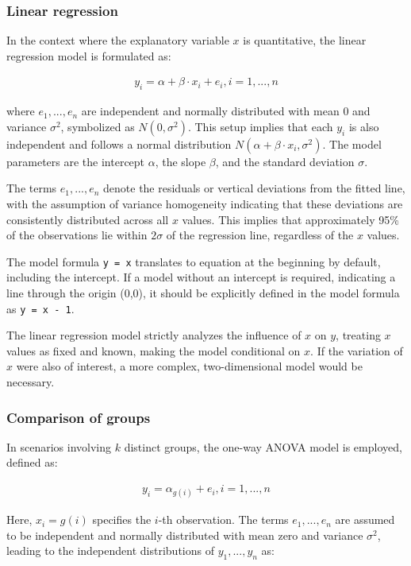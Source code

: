 \documentclass{article}
\begin{document}
\subsubsection{Linear regression}

In the context where the explanatory variable $x$ is quantitative, the linear regression model is formulated as:

\begin{align*}
    y_i=\alpha + \beta \cdot x_i + e_i, i=1,...,n
\end{align*}

where $e_1,...,e_n$ are independent and normally distributed with mean 0 and variance $\sigma^2$, symbolized as $N(0,\sigma^2)$. This setup implies that each $y_i$ is also independent and follows a normal distribution $N(\alpha + \beta \cdot x_i,\sigma^2)$. The model parameters are the intercept $\alpha$, the slope $\beta$, and the standard deviation $\sigma$.

The terms $e_1,...,e_n$ denote the residuals or vertical deviations from the fitted line, with the assumption of variance homogeneity indicating that these deviations are consistently distributed across all $x$ values. This implies that approximately 95\% of the observations lie within $2\sigma$ of the regression line, regardless of the $x$ values.

The model formula \verb|y = x| translates to equation at the beginning by default, including the intercept. If a model without an intercept is required, indicating a line through the origin (0,0), it should be explicitly defined in the model formula as \verb|y = x - 1|.

The linear regression model strictly analyzes the influence of $x$ on $y$, treating $x$ values as fixed and known, making the model conditional on $x$. If the variation of $x$ were also of interest, a more complex, two-dimensional model would be necessary.

\subsubsection{Comparison of groups}

In scenarios involving $k$ distinct groups, the one-way ANOVA model is employed, defined as:

\begin{align*}
    y_i=\alpha_{g(i)}+e_i, i=1,...,n
\end{align*}

Here, $x_i=g(i)$ specifies the $i$-th observation. The terms $e_1,...,e_n$ are assumed to be independent and normally distributed with mean zero and variance $\sigma^2$, leading to the independent distributions of $y_1,...,y_n$ as:
\end{document}
